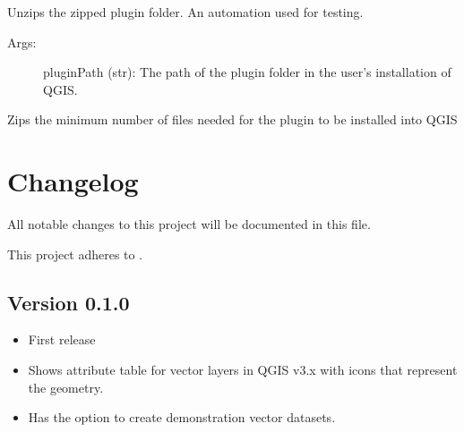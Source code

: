 \documentclass[letterpaper,11pt,english]{sphinxmanual}
\begin{document}
\begin{fulllineitems}
\label{\detokenize{API:zipGeomAttribute.installGeomAttributeFromZip}}
Unzips the zipped plugin folder.  An automation used for testing.
\begin{description}
\item[{Args:}] \leavevmode
pluginPath (str): The path of the plugin folder in the user’s installation of QGIS.

\end{description}

\end{fulllineitems}


\begin{fulllineitems}
\label{\detokenize{API:zipGeomAttribute.zipGeomAttribute}}
Zips the minimum number of files needed for the plugin to be installed into QGIS

\end{fulllineitems}



\chapter{Changelog}
\label{\detokenize{changelog:changelog}}\label{\detokenize{changelog::doc}}
All notable changes to this project will be documented in this file.

This project adheres to .


\section{Version 0.1.0}
\label{\detokenize{changelog:version-0-1-0}}\begin{itemize}
\item {} 
First release

\item {} 
Shows attribute table for vector layers in QGIS v3.x with icons that represent the geometry.

\item {} 
Has the option to create demonstration vector datasets.

\end{itemize}
\end{document}

